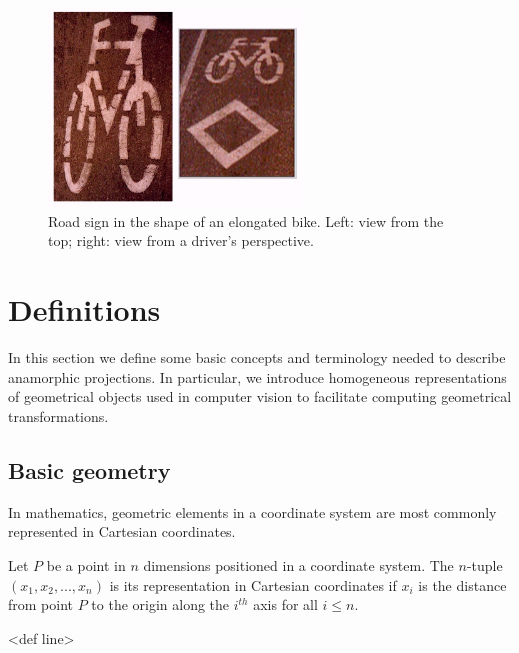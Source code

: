 \documentclass[11pt, oneside, reqno]{book}
\begin{document}
\begin{figure}[h]
\centering
\includegraphics[width=0.6\textwidth]{data/bikes}
\caption{Road sign in the shape of an elongated bike. Left: view from the top; right: view from a driver's perspective.~\cite{bib:ana_hun}}
\label{fig:bik}
\end{figure}



\section{Definitions}
\label{sec:def}

In this section we define some basic concepts and terminology needed to describe anamorphic projections. In particular, we introduce homogeneous representations of geometrical objects used in computer vision to facilitate computing geometrical transformations.

\subsection{Basic geometry}
In mathematics, geometric elements in a coordinate system are most commonly represented in Cartesian coordinates. 

\begin{definition}  
\label{def:cpoint}
Let $P$ be a point in $n$ dimensions positioned in a coordinate system. The $n$-tuple $(x_1, x_2, ..., x_n)$ is its representation in Cartesian coordinates if $x_i$ is the distance from point $P$ to the origin along the $i^{th}$ axis for all $i \le n$.
\end{definition}

\begin{definition}  
\label{def:cline}
<def line> %
\end{definition}
\end{document}
